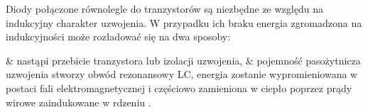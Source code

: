 Diody połączone równolegle do tranzystorów są niezbędne ze względu na indukcyjny charakter uzwojenia. W przypadku ich braku energia zgromadzona na indukcyjności może rozładować się na dwa sposoby: 

\begin{easylist}
	& nastąpi przebicie tranzystora lub izolacji uzwojenia,
	& pojemność pasożytnicza uzwojenia stworzy obwód rezonansowy LC, energia zostanie wypromieniowana w postaci fali elektromagnetycznej i częściowo zamieniona w ciepło poprzez prądy wirowe zaindukowane w rdzeniu \cite{przepiorkowski}.
	\\
\end{easylist}





\clearpage




